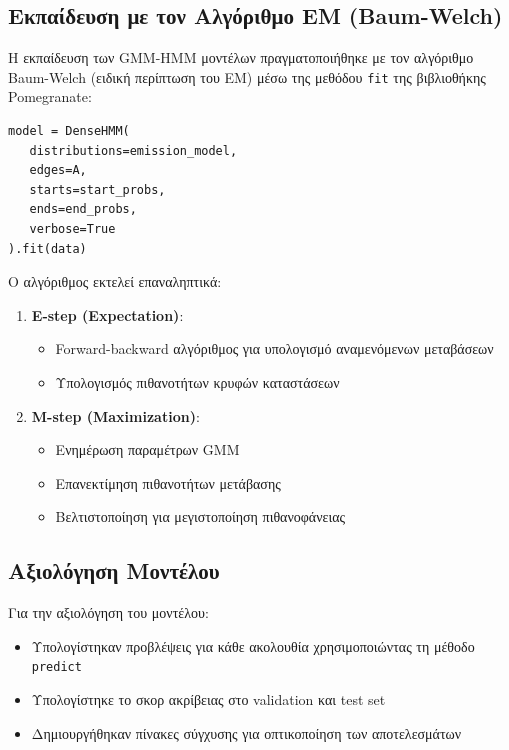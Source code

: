 \documentclass[a4paper,12pt]{article}
\begin{document}
\subsection*{Εκπαίδευση με τον Αλγόριθμο EM (Baum-Welch)}

Η εκπαίδευση των GMM-HMM μοντέλων πραγματοποιήθηκε με τον αλγόριθμο Baum-Welch (ειδική περίπτωση του EM) μέσω της μεθόδου \texttt{fit} της βιβλιοθήκης Pomegranate:

\begin{verbatim}
model = DenseHMM(
   distributions=emission_model,
   edges=A,
   starts=start_probs,
   ends=end_probs,
   verbose=True
).fit(data)
\end{verbatim}

Ο αλγόριθμος εκτελεί επαναληπτικά:

\begin{enumerate}
   \item \textbf{E-step (Expectation)}:
   \begin{itemize}
       \item Forward-backward αλγόριθμος για υπολογισμό αναμενόμενων μεταβάσεων
       \item Υπολογισμός πιθανοτήτων κρυφών καταστάσεων
   \end{itemize}

   \item \textbf{M-step (Maximization)}:
   \begin{itemize}
       \item Ενημέρωση παραμέτρων GMM
       \item Επανεκτίμηση πιθανοτήτων μετάβασης
       \item Βελτιστοποίηση για μεγιστοποίηση πιθανοφάνειας
   \end{itemize}
\end{enumerate}

\subsection*{Αξιολόγηση Μοντέλου}

Για την αξιολόγηση του μοντέλου:

\begin{itemize}
   \item Υπολογίστηκαν προβλέψεις για κάθε ακολουθία χρησιμοποιώντας τη μέθοδο \texttt{predict}
   \item Υπολογίστηκε το σκορ ακρίβειας στο validation και test set
   \item Δημιουργήθηκαν πίνακες σύγχυσης για οπτικοποίηση των αποτελεσμάτων
\end{itemize}




\end{document}
